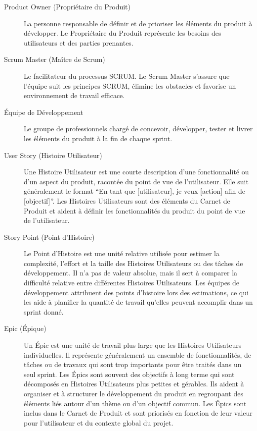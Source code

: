 \begin{description}
    \item[Product Owner (Propriétaire du Produit)] La personne responsable de définir et de prioriser les éléments du produit à développer. Le Propriétaire du Produit représente les besoins des utilisateurs et des parties prenantes.
    \item[Scrum Master (Maître de Scrum)] Le facilitateur du processus SCRUM. Le Scrum Master s'assure que l'équipe suit les principes SCRUM, élimine les obstacles et favorise un environnement de travail efficace.
    \item[Équipe de Développement] Le groupe de professionnels chargé de concevoir, développer, tester et livrer les éléments du produit à la fin de chaque sprint.
    \item[User Story (Histoire Utilisateur)] Une Histoire Utilisateur est une courte description d'une fonctionnalité ou d'un aspect du produit, racontée du point de vue de l'utilisateur. Elle suit généralement le format ``En tant que [utilisateur], je veux [action] afin de [objectif]''. Les Histoires Utilisateurs sont des éléments du Carnet de Produit et aident à définir les fonctionnalités du produit du point de vue de l'utilisateur.
    \item[Story Point (Point d'Histoire)] Le Point d'Histoire est une unité relative utilisée pour estimer la complexité, l'effort et la taille des Histoires Utilisateurs ou des tâches de développement. Il n'a pas de valeur absolue, mais il sert à comparer la difficulté relative entre différentes Histoires Utilisateurs. Les équipes de développement attribuent des points d'histoire lors des estimations, ce qui les aide à planifier la quantité de travail qu'elles peuvent accomplir dans un sprint donné.
    \item[Epic (Épique)] Un Épic est une unité de travail plus large que les Histoires Utilisateurs individuelles. Il représente généralement un ensemble de fonctionnalités, de tâches ou de travaux qui sont trop importants pour être traités dans un seul sprint. Les Épics sont souvent des objectifs à long terme qui sont décomposés en Histoires Utilisateurs plus petites et gérables. Ils aident à organiser et à structurer le développement du produit en regroupant des éléments liés autour d'un thème ou d'un objectif commun. Les Épics sont inclus dans le Carnet de Produit et sont priorisés en fonction de leur valeur pour l'utilisateur et du contexte global du projet.
\end{description}


